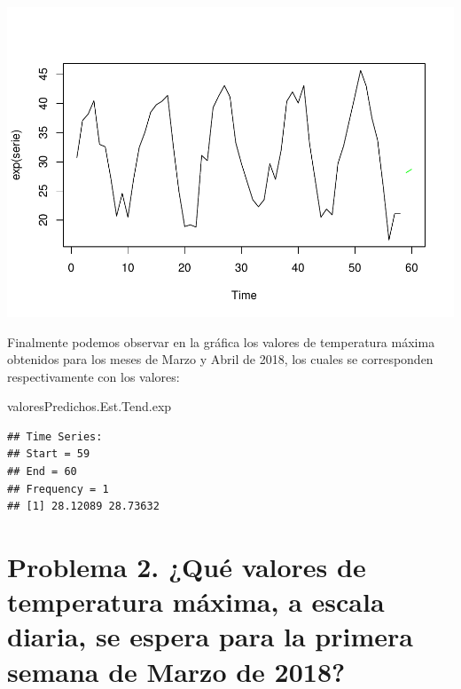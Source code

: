 \documentclass[]{article}
\newenvironment{Shaded}{\begin{snugshade}}{\end{snugshade}}
\newcommand{\NormalTok}[1]{#1}
\begin{document}
\includegraphics{timeSeries_files/figure-latex/unnamed-chunk-33-1.pdf}

Finalmente podemos observar en la gráfica los valores de temperatura
máxima obtenidos para los meses de Marzo y Abril de 2018, los cuales se
corresponden respectivamente con los valores:

\begin{Shaded}
\begin{Highlighting}[]
\NormalTok{valoresPredichos.Est.Tend.exp}
\end{Highlighting}
\end{Shaded}

\begin{verbatim}
## Time Series:
## Start = 59 
## End = 60 
## Frequency = 1 
## [1] 28.12089 28.73632
\end{verbatim}

\section{Problema 2.  ¿Qué valores de temperatura máxima, a escala diaria, se espera para la primera semana de Marzo de 2018?}
\end{document}
